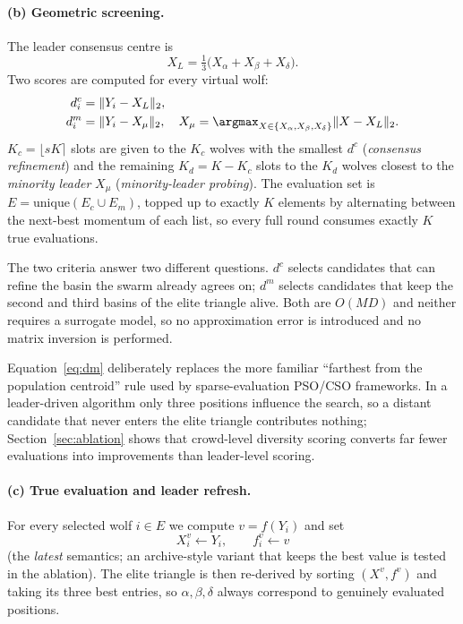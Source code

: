 \paragraph{(b) Geometric screening.}
The leader consensus centre is
\begin{equation}
X_{L} = \tfrac{1}{3}\bigl(X_\alpha + X_\beta + X_\delta\bigr).
\end{equation}
Two scores are computed for every virtual wolf:
\begin{align}
d^{c}_{i} &= \lVert Y_i - X_{L} \rVert_2, \label{eq:dc}\\
d^{m}_{i} &= \lVert Y_i - X_{\mu} \rVert_2,
\quad X_{\mu} = \argmax_{X \in \{X_\alpha, X_\beta, X_\delta\}} \lVert X - X_L \rVert_2 .
\label{eq:dm}
\end{align}
$K_c = \lfloor s K \rceil$ slots are given to the $K_c$ wolves with the smallest
$d^{c}$ (\emph{consensus refinement}) and the remaining $K_d = K-K_c$ slots to
the $K_d$ wolves closest to the \emph{minority leader} $X_{\mu}$
(\emph{minority-leader probing}). The evaluation set is
$E = \mathrm{unique}(E_c \cup E_m)$, topped up to exactly $K$ elements by
alternating between the next-best momentum of each list, so every full round
consumes exactly $K$ true evaluations.

The two criteria answer two different questions. $d^{c}$ selects candidates that
can refine the basin the swarm already agrees on; $d^{m}$ selects candidates that
keep the second and third basins of the elite triangle alive. Both are
$O(MD)$ and neither requires a surrogate model, so no approximation error is
introduced and no matrix inversion is performed.

Equation~\eqref{eq:dm} deliberately replaces the more familiar
``farthest from the population centroid'' rule used by sparse-evaluation
PSO/CSO frameworks. In a leader-driven algorithm only three positions influence
the search, so a distant candidate that never enters the elite triangle
contributes nothing; Section~\ref{sec:ablation} shows that crowd-level diversity
scoring converts far fewer evaluations into improvements than leader-level
scoring.

\paragraph{(c) True evaluation and leader refresh.}
For every selected wolf $i \in E$ we compute $v = f(Y_i)$ and set
\begin{equation}
X^{v}_i \leftarrow Y_i, \qquad f^{v}_i \leftarrow v
\end{equation}
(the \emph{latest} semantics; an archive-style variant that keeps the best
value is tested in the ablation). The elite triangle is then re-derived by
sorting $(X^v, f^v)$ and taking its three best entries, so $\alpha,\beta,\delta$
always correspond to genuinely evaluated positions.

